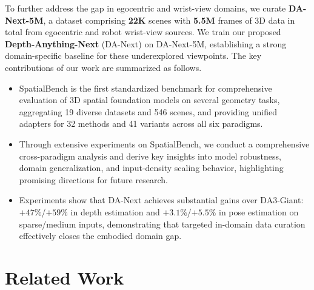 \documentclass{llmxive}
\providecommand{\benchmark}{SpatialBench\xspace}
\providecommand{\dataset}{DA-Next-5M\xspace}
\providecommand{\ours}{DA-Next\xspace}
\begin{document}
To further address the gap in egocentric and wrist-view domains, we curate \textbf{\dataset}, a dataset comprising \textbf{22K} scenes with \textbf{5.5M} frames of 3D data in total from egocentric and robot wrist-view sources. 
%
We train our proposed \textbf{Depth-Anything-Next} (\ours) on \dataset, establishing a strong domain-specific baseline for these underexplored viewpoints.
%
The key contributions of our work are summarized as follows.
\begin{itemize}
    \item \benchmark is the first standardized benchmark for comprehensive evaluation of 3D spatial foundation models on several geometry tasks, aggregating 19 diverse datasets and 546 scenes, and providing unified adapters for 32 methods and 41 variants across all six paradigms.
    \item Through extensive experiments on \benchmark, we conduct a comprehensive cross-paradigm analysis and derive key insights into model robustness, domain generalization, and input-density scaling behavior, highlighting promising directions for future research.
    \item Experiments show that \ours achieves substantial gains over DA3-Giant: $+47\%$/$+59\%$ in depth estimation and $+3.1\%$/$+5.5\%$ in pose estimation on sparse/medium inputs, demonstrating that targeted in-domain data curation effectively closes the embodied domain gap.
\end{itemize}

\section{Related Work}
\label{appendix:related}
\end{document}
